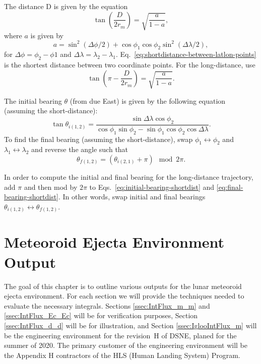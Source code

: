 \documentclass{hitec}
\begin{document}
The distance D is given by the equation
\begin{equation}\label{eq:shortdistance-between-latlon-points}
\tan\left(\frac{D}{2r_m}\right) = \sqrt{\frac{a}{1-a}},
\end{equation}
where $a$ is given by
\begin{equation}
a = \sin^2(\Delta\phi/2) + \cos\phi_1\cos\phi_2\sin^2(\Delta\lambda/2),
\end{equation}
for $\Delta\phi = \phi_2-\phi1$ and $\Delta\lambda = \lambda_2-\lambda_1$. Eq.\ \eqref{eq:shortdistance-between-latlon-points} is the shortest distance between two coordinate points. For the long-distance, use
\begin{equation}
\tan\left(\pi-\frac{D}{2r_m}\right) = \sqrt{\frac{a}{1-a}}.
\end{equation}

The initial bearing $\theta$ (from due East) is given by the following equation (assuming the short-distance):
\begin{equation}\label{eq:initial-bearing-shortdist}
\tan\theta_{i(1,2)} = \frac{\sin\Delta\lambda\cos\phi_2}{\cos\phi_1\sin\phi_2-\sin\phi_1\cos\phi_2\cos\Delta\lambda}.
\end{equation}
To find the final bearing (assuming the short-distance), swap $\phi_1\longleftrightarrow\phi_2$ and $\lambda_1\longleftrightarrow\lambda_2$ and reverse the angle such that
\begin{equation}\label{eq:final-bearing-shortdist}
\theta_{f(1,2)} = (\theta_{i(2,1)} + \pi)\mod 2\pi.
\end{equation}

In order to compute the initial and final bearing for the long-distance trajectory, add $\pi$ and then mod by $2\pi$ to Eqs.\ \eqref{eq:initial-bearing-shortdist} and \eqref{eq:final-bearing-shortdist}. In other words, swap initial and final bearings $\theta_{i(1,2)}\longleftrightarrow\theta_{f(1,2)}$.

\section{Meteoroid Ejecta Environment Output}

The goal of this chapter is to outline various outputs for the lunar meteoroid ejecta environment. For each section we will provide the techniques needed to evaluate the necessary integrals. Sections \ref{ssec:IntFlux_m_m} and \ref{ssec:IntFlux_Ec_Ec} will be for verification purposes, Section \ref{ssec:IntFlux_d_d} will be for illustration, and Section \ref{ssec:IglooIntFlux_m} will be the engineering environment for the revision~H of DSNE, planed for the summer of 2020. The primary customer of the engineering environment will be the Appendix H contractors of the HLS (Human Landing System) Program.
\end{document}
